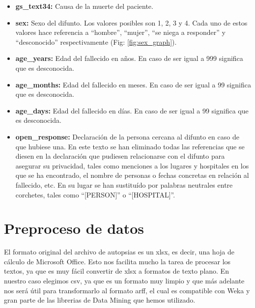 \documentclass[10pt,a4paper]{article}
\begin{document}
\begin{itemize}
\item \textbf{gs\_text34:} Causa de la muerte del paciente.
\item \textbf{sex:} Sexo del difunto. Los valores posibles son 1, 2, 3 y 4. Cada uno de estos valores hace referencia a ``hombre'', ``mujer'', ``se niega a responder'' y ``desconocido'' respectivamente (Fig: \ref{fig:sex_graph}).
\item \textbf{age\_years:} Edad del fallecido en años. En caso de ser igual a 999 significa que es desconocida.
\item \textbf{age\_months:} Edad del fallecido en meses. En caso de ser igual a 99 significa que es desconocida.
\item \textbf{age\_days:} Edad del fallecido en días. En caso de ser igual a 99 significa que es desconocida.
\item \textbf{open\_response:} Declaración de la persona cercana al difunto en caso de que hubiese una. En este texto se han eliminado todas las referencias que se diesen en la declaración que pudiesen relacionarse con el difunto para asegurar su privacidad, tales como menciones a los lugares y hospitales en los que se ha encontrado, el nombre de personas o fechas concretas en relación al fallecido, etc. En su lugar se han sustituído por palabras neutrales entre corchetes, tales como ``[PERSON]'' o ``[HOSPITAL]''.
\end{itemize}

\section{Preproceso de datos}
El formato original del archivo de autopsias es un xlsx, es decir, una hoja de cálculo de Microsoft Office. Esto nos facilita mucho la tarea de procesar los textos, ya que es muy fácil convertir de xlsx a formatos de texto plano. En nuestro caso elegimos csv, ya que es un formato muy limpio y que más adelante nos será útil para transformarlo al formato arff, el cual es compatible con Weka y gran parte de las librerias de Data Mining que hemos utilizado.\\
\end{document}
